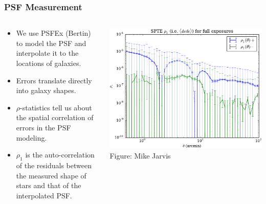 \documentclass{beamer}
\begin{document}
\frame
{
    \frametitle{PSF Measurement}

    \fontsize{9}{0.8\baselineskip}

    \begin{columns}
        \begin{column}{0.45\textwidth}
            \begin{itemize}

                \item We use PSFEx (Bertin) to model the PSF and interpolate it to
                    the locations of galaxies.

                \item Errors translate directly into galaxy shapes.

                \item $\rho$-statistics tell us about the spatial correlation 
                    of errors in the PSF modeling.

                \item $\rho_1$ is the auto-correlation of the residuals between
                    the measured shape of stars and that of the interpolated PSF.

            \end{itemize}
        \end{column}
        \begin{column}{0.55\textwidth}

            \begin{center}
                \includegraphics[width=\textwidth]{exp_rho1_crop.pdf}
                \newline
                {\tiny Figure: Mike Jarvis}
            \end{center}
        \end{column}
    \end{columns}

}
\end{document}
